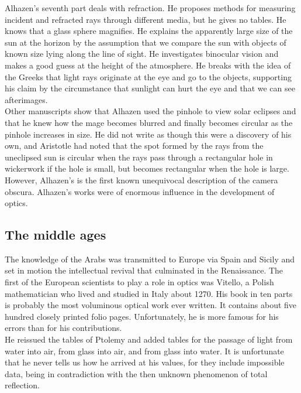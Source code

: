             Alhazen's seventh part deals with refraction. He proposes methods for measuring incident and refracted rays through different media, but he gives no tables. He knows that a glass sphere magnifies. He explains the apparently large size of the sun at the horizon by the assumption that we compare the sun with objects of known size lying along the line of sight. He investigates binocular vision and makes a good guess at the height of the atmosphere. He breaks with the idea of the Greeks that light rays originate at the eye and go to the objects, supporting his claim by the circumstance that sunlight can hurt the eye and that we can see afterimages.\\

            Other manuscripts show that Alhazen used the pinhole to view solar eclipses and that he knew how the mage becomes blurred and finally becomes circular as the pinhole increases in size. He did not write as though this were a discovery of his own, and Aristotle  had noted that the spot formed by the rays from the uneclipsed sun is circular when the rays pass through a rectangular hole in wickerwork if the hole is small, but becomes rectangular when the hole is large. However, Alhazen's is the first known unequivocal description of the camera obscura. Alhazen's works were of enormous influence in the development of optics.

        \subsection{The middle ages}

            The knowledge of the Arabs was transmitted to Europe via Spain and Sicily and set in motion the intellectual revival that culminated in the Renaissance. The first of the European scientists to play a role in optics was Vitello, a Polish mathematician who lived and studied in Italy about 1270. His book in ten parts is probably the most voluminous optical work ever written. It contains about five hundred closely printed folio pages. Unfortunately, he is more famous for his errors than for his contributions.\\

            He reissued the tables of Ptolemy and added tables for the passage of light from water into air, from glass into air, and from glass into water. It is unfortunate that he never tells us how he arrived at his values, for they include impossible data, being in contradiction with the then unknown phenomenon of total reflection.
            
